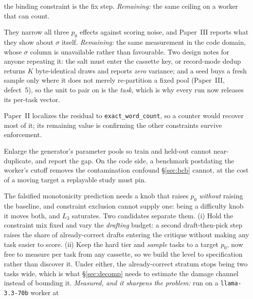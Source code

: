 \documentclass[11pt]{article}
\begin{document}
\begin{description}
    the binding constraint is the fix step. \emph{Remaining:} the same ceiling on a worker that
    can count.
  \item[D7 (statistics), \textbf{done}, $135$ re-scorings (\S\ref{sec:repeat}).] They narrow
    all three $p_0$ effects against scoring noise, and Paper~III reports what they show about
    $\sigma$ itself.
    \emph{Remaining:} the same measurement in the code domain, whose $\sigma$
    column is unavailable rather than favourable. Two
    design notes for anyone repeating it: the salt must enter the cassette key, or record-mode
    dedup returns $K$ byte-identical draws and reports \emph{zero} variance; and a seed buys a
    fresh sample only where it does not merely re-partition a fixed pool (Paper~III, defect~5), so the
    unit to pair on is the \emph{task}, which is why every run now releases its per-task vector.
  \item[D1$'$-tools (deterministic actuator).] Paper~II localizes the residual to
    \texttt{exact\_word\_count}, so a counter would recover most of it; its remaining value is
    confirming the other constraints survive enforcement.
  \item[D8 (generalization).] Enlarge the generator's parameter pools so train and held-out
    cannot near-duplicate, and report the gap. On the code side, a benchmark postdating the
    worker's cutoff \citep{jain2024livecodebench} removes the contamination confound
    \S\ref{sec:bcb} cannot, at the cost of a moving target a replayable study must pin.
  \item[D9 (a high-$p_0$ level that does not saturate), \emph{the open design problem}.] The
    falsified monotonicity prediction needs a knob that raises $p_0$ \emph{without} raising the
    baseline, and constraint exclusion cannot supply one: being a difficulty knob it moves both,
    and $L_3$ saturates. Two candidates separate them. (i) Hold the constraint mix fixed and
    vary the \emph{drafting} budget: a second draft-then-pick step raises the share of
    already-correct drafts entering the critique without making any task easier to score.
    (ii) Keep the hard tier and \emph{sample} tasks to a target $p_0$, now free to measure per
    task from any cassette, so we build the level to specification rather than discover it. Under
    either, the already-correct stratum stops being two tasks wide, which is what
    \S\ref{sec:decomp} needs to estimate the damage channel instead of bounding it.
    \emph{Measured, and it sharpens the problem:} run on a \texttt{llama-3.3-70b} worker at

\end{description}
\end{document}
